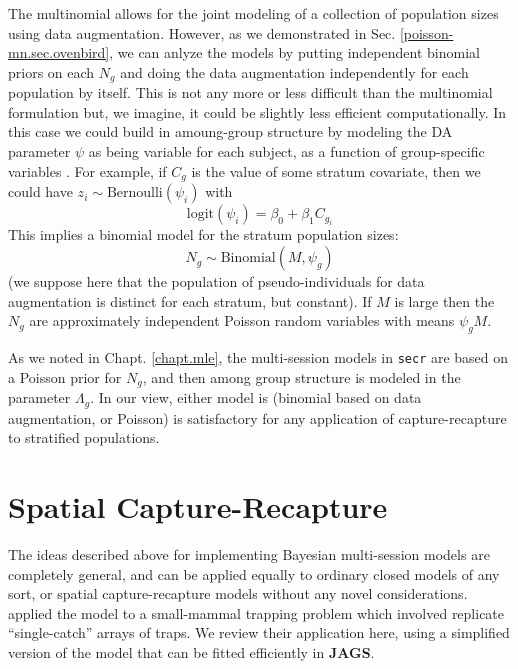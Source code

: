 The multinomial allows for the joint modeling of a collection of
population sizes using data augmentation.  However, as we 
demonstrated in Sec. \ref{poisson-mn.sec.ovenbird}, we can anlyze the models by putting
independent binomial priors on each $N_{g}$ and doing the data
augmentation independently for each population by itself. 
This is not any more or less difficult than the multinomial
formulation but, we imagine, it could be slightly less efficient computationally.
In this case we could build in amoung-group structure by modeling 
the DA parameter $\psi$ as being
variable for each subject,  as a function of group-specific variables
\citep[see][for an example]{hendriks_etal:2013}.
For example, if $C_{g}$ is the value of some stratum
covariate, then we could have $z_{i} \sim \mbox{Bernoulli}( \psi_{i})$
with
\[
 \mbox{logit}(\psi_{i}) = \beta_0 + \beta_1  C_{g_{i}}
\]
This implies a binomial model for the stratum population sizes:
\[
N_{g} \sim \mbox{Binomial}(M, \psi_{g})
\]  
(we suppose here that the population of pseudo-individuals for data
augmentation is distinct for each stratum, but constant).
If $M$ is large then the $N_{g}$ are approximately
independent Poisson random variables with means $\psi_{g} M$.

As we noted in Chapt. \ref{chapt.mle}, 
the multi-session models in \mbox{\tt secr}  are based on a
Poisson prior for $N_{g}$, and then among group structure is modeled in
the parameter $\Lambda_{g}$. In our view, either model is (binomial
based on data augmentation, or Poisson) is satisfactory for any
application of capture-recapture to stratified populations.  


\section{Spatial Capture-Recapture}


The ideas described above for implementing Bayesian multi-session
models are completely general, and can be applied equally to ordinary
closed models of any sort, or spatial capture-recapture models without
any novel considerations.  \citet{royle_converse:2013} applied the
model to a small-mammal trapping problem which involved replicate
``single-catch'' arrays of traps. We review their application here,
using a simplified version of the model that can be fitted efficiently
in {\bf JAGS}.

